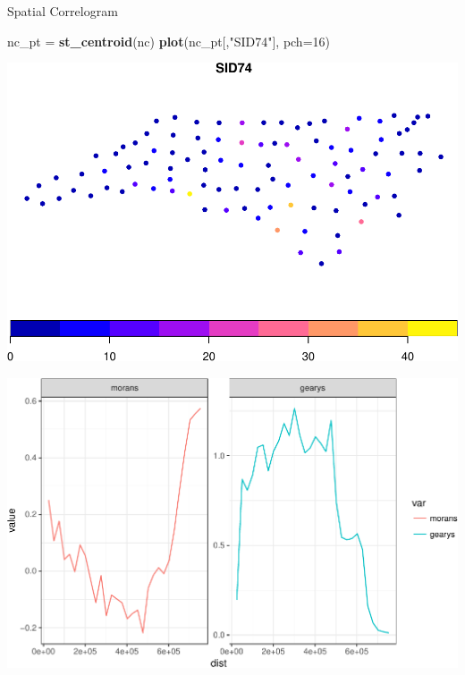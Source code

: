 \documentclass[11pt,ignorenonframetext,]{beamer}
\newenvironment{Shaded}{}{}
\newcommand{\DataTypeTok}[1]{\textcolor[rgb]{0.56,0.13,0.00}{#1}}
\newcommand{\DecValTok}[1]{\textcolor[rgb]{0.25,0.63,0.44}{#1}}
\newcommand{\KeywordTok}[1]{\textcolor[rgb]{0.00,0.44,0.13}{\textbf{#1}}}
\newcommand{\NormalTok}[1]{#1}
\newcommand{\StringTok}[1]{\textcolor[rgb]{0.25,0.44,0.63}{#1}}
\let\oldShaded\Shaded
\let\endoldShaded\endShaded
\renewenvironment{Shaded}{\footnotesize\begin{spacing}{0.9}\oldShaded}{\endoldShaded\end{spacing}}
\let\oldverbatim\verbatim
\let\endoldverbatim\endverbatim
\newcommand{\scriptoutput}{
  \renewenvironment{Shaded}{\scriptsize\begin{spacing}{0.9}\oldShaded}{\endoldShaded\end{spacing}}
  \renewenvironment{verbatim}{\scriptsize\begin{spacing}{0.9}\oldverbatim}{\endoldverbatim\end{spacing}}
}
\begin{document}
\begin{frame}[fragile]{Spatial Correlogram}
\protect\hypertarget{spatial-correlogram}{}

\scriptoutput

\begin{Shaded}
\begin{Highlighting}[]
\NormalTok{nc_pt =}\StringTok{ }\KeywordTok{st_centroid}\NormalTok{(nc)}
\KeywordTok{plot}\NormalTok{(nc_pt[,}\StringTok{"SID74"}\NormalTok{], }\DataTypeTok{pch=}\DecValTok{16}\NormalTok{)}
\end{Highlighting}
\end{Shaded}

\begin{center}\includegraphics[width=\textwidth]{Lec17_files/figure-beamer/unnamed-chunk-4-1} \end{center}

\end{frame}

\begin{frame}{}
\protect\hypertarget{section}{}

\begin{center}\includegraphics[width=\textwidth]{Lec17_files/figure-beamer/unnamed-chunk-5-1} \end{center}

\end{frame}
\end{document}
